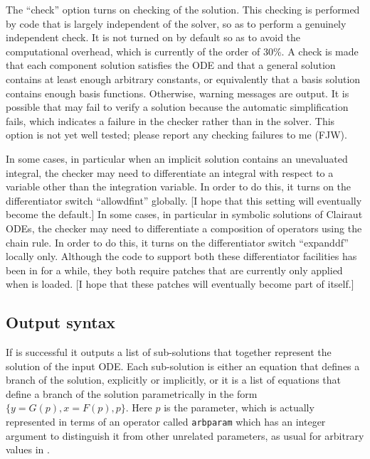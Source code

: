 The ``check'' option turns on checking of the solution.  This checking
is performed by code that is largely independent of the solver, so as
to perform a genuinely independent check.  It is not turned on by
default so as to avoid the computational overhead, which is currently
of the order of 30\%.  A check is made that each component solution
satisfies the ODE and that a general solution contains at least enough
arbitrary constants, or equivalently that a basis solution contains
enough basis functions.  Otherwise, warning messages are output.  It
is possible that  may fail to verify a solution because
the automatic simplification fails, which indicates a failure in the
checker rather than in the solver.  This option is not yet well
tested; please report any checking failures to me (FJW).

In some cases, in particular when an implicit solution contains an
unevaluated integral, the checker may need to differentiate an
integral with respect to a variable other than the integration
variable.  In order to do this, it turns on the differentiator switch
``allowdfint'' globally.  [I hope that this setting will eventually
become the default.]  In some cases, in particular in symbolic
solutions of Clairaut ODEs, the checker may need to differentiate a
composition of operators using the chain rule.  In order to do this,
it turns on the differentiator switch ``expanddf'' locally only.
Although the code to support both these differentiator facilities has
been in \REDUCE{} for a while, they both require patches that are
currently only applied when  is loaded.  [I hope that
these patches will eventually become part of \REDUCE{} itself.]


\subsection{Output syntax}

If  is successful it outputs a list of sub-solutions that
together represent the solution of the input ODE\@.  Each sub-solution
is either an equation that defines a branch of the solution,
explicitly or implicitly, or it is a list of equations that define a
branch of the solution parametrically in the form $\{y = G(p), x =
F(p), p\}$.  Here $p$ is the parameter, which is actually represented
in terms of an operator called \texttt{arbparam} which has an integer
argument to distinguish it from other unrelated parameters, as usual
for arbitrary values in \REDUCE{}.

